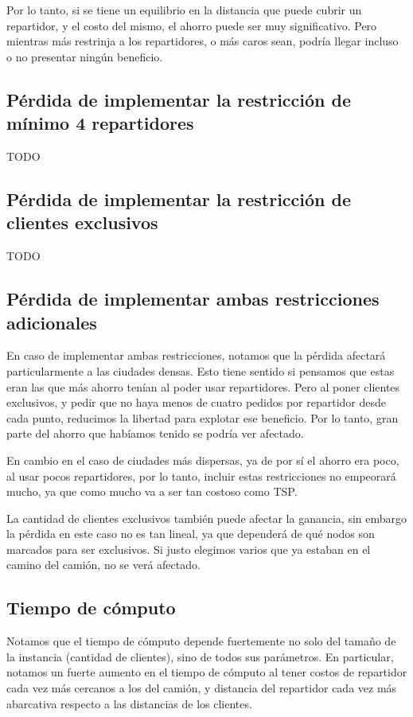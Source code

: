 \documentclass{article}
\begin{document}
    Por lo tanto, si se tiene un equilibrio en la distancia que puede cubrir un repartidor, y el costo del mismo, el ahorro puede ser muy significativo. Pero mientras más restrinja a los repartidores, o más caros sean, podría llegar incluso o no presentar ningún beneficio.

    \subsection{Pérdida de implementar la restricción de mínimo 4 repartidores}
    TODO

    \subsection{Pérdida de implementar la restricción de clientes exclusivos}
    TODO

    \subsection{Pérdida de implementar ambas restricciones adicionales}
    En caso de implementar ambas restricciones, notamos que la pérdida afectará particularmente a las ciudades densas. Esto tiene sentido si pensamos que estas eran las que más ahorro tenían al poder usar repartidores. Pero al poner clientes exclusivos, y pedir que no haya menos de cuatro pedidos por repartidor desde cada punto, reducimos la libertad para explotar ese beneficio. Por lo tanto, gran parte del ahorro que habíamos tenido se podría ver afectado.

    En cambio en el caso de ciudades más dispersas, ya de por sí el ahorro era poco, al usar pocos repartidores, por lo tanto, incluir estas restricciones no empeorará mucho, ya que como mucho va a ser tan costoso como TSP.
    
    La cantidad de clientes exclusivos también puede afectar la ganancia, sin embargo la pérdida en este caso no es tan lineal, ya que dependerá de qué nodos son marcados para ser exclusivos. Si justo elegimos varios que ya estaban en el camino del camión, no se verá afectado.

    \subsection{Tiempo de cómputo}
    Notamos que el tiempo de cómputo depende fuertemente no solo del tamaño de la instancia (cantidad de clientes), sino de todos sus parámetros. En particular, notamos un fuerte aumento en el tiempo de cómputo al tener costos de repartidor cada vez más cercanos a los del camión, y distancia del repartidor cada vez más abarcativa respecto a las distancias de los clientes.
    
\end{document}
